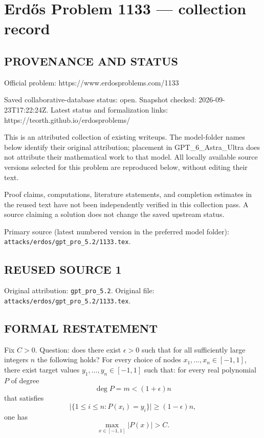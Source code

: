 \section*{Erd\H{o}s Problem 1133 --- collection record}

\subsection*{PROVENANCE AND STATUS}
Official problem: https://www.erdosproblems.com/1133

Saved collaborative-database status: open.
Snapshot checked: 2026-09-23T17:22:24Z.
Latest status and formalization links: https://teorth.github.io/erdosproblems/

This is an attributed collection of existing writeups. The model-folder names below identify their original attribution; placement in GPT\_6\_Astra\_Ultra does not attribute their mathematical work to that model. All locally available source versions selected for this problem are reproduced below, without editing their text.

Proof claims, computations, literature statements, and completion estimates in the reused text have not been independently verified in this collection pass. A source claiming a solution does not change the saved upstream status.

Primary source (latest numbered version in the preferred model folder): \texttt{attacks/erdos/gpt\_pro\_5.2/1133.tex}.

\subsection*{REUSED SOURCE 1}
Original attribution: \texttt{gpt\_pro\_5.2}.
Original file: \texttt{attacks/erdos/gpt\_pro\_5.2/1133.tex}.


\subsection*{FORMAL RESTATEMENT}
Fix $C>0$.
Question: does there exist $\epsilon>0$ such that for all sufficiently large integers $n$ the following holds?
For every choice of nodes $x_1,\dots,x_n\in[-1,1]$, there exist target values $y_1,\dots,y_n\in[-1,1]$ such that:
for every real polynomial $P$ of degree
\[
\deg P = m < (1+\epsilon)n
\]
that satisfies
\[
\lvert\{1\le i\le n: P(x_i)=y_i\}\rvert\ge (1-\epsilon)n,
\]
one has
\[
\max_{x\in[-1,1]} |P(x)|>C.
\]

